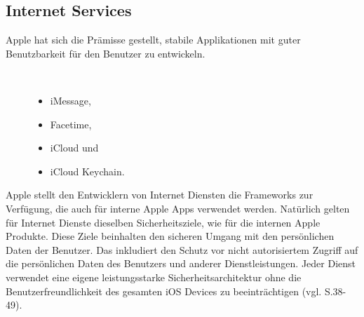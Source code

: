 \subsection{Internet Services}
\label{sec:InternetServices}

Apple hat sich die Prämisse gestellt, stabile Applikationen mit guter Benutzbarkeit für den Benutzer zu entwickeln. 
\begin{description}
    \item[\parbox{\textwidth} {Beispiele für solche internen iOS Apps sind }]~\par
        \begin{itemize}
            \item iMessage,
            \item Facetime,
            \item iCloud und 
            \item iCloud Keychain.
        \end{itemize}
\end{description} 

Apple stellt den Entwicklern von Internet Diensten die Frameworks zur Verfügung, die auch für interne Apple Apps verwendet werden. Natürlich gelten für Internet Dienste dieselben Sicherheitsziele, wie für die internen Apple Produkte. Diese Ziele beinhalten den sicheren Umgang mit den persönlichen Daten der Benutzer. Das inkludiert den Schutz vor nicht autorisiertem Zugriff auf die persönlichen Daten des Benutzers und anderer Dienstleistungen. Jeder Dienst verwendet eine eigene leistungsstarke Sicherheitsarchitektur ohne die Benutzerfreundlichkeit des gesamten iOS Devices zu beeinträchtigen (vgl. \cite{Apple[4]} S.38-49).

